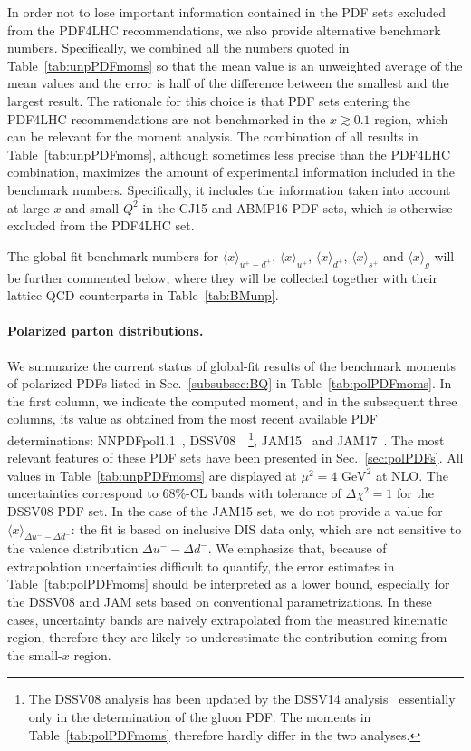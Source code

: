 In order not to lose important information contained in the PDF sets excluded 
from the PDF4LHC recommendations, we also provide alternative benchmark numbers.
%
Specifically, we combined all the numbers quoted in Table~\ref{tab:unpPDFmoms}
so that the mean value is an unweighted average of the mean 
values and the error is half of the difference between the smallest and the 
largest result.
%
The rationale for this choice is that PDF sets entering the PDF4LHC 
recommendations are not benchmarked in the $x\gtrsim 0.1$ region, which can be 
relevant for the moment analysis.
%
The combination of all results in Table~\ref{tab:unpPDFmoms}, although 
sometimes less precise than the PDF4LHC combination, maximizes the amount of 
experimental information included in the benchmark numbers.
%
Specifically, it includes the information taken into account 
at large $x$ and small $Q^2$ in the CJ15 and ABMP16 PDF sets, 
which is otherwise excluded from the PDF4LHC set.

The global-fit benchmark numbers for $\langle x\rangle_{u^+-d^+}$,
$\langle x \rangle_{u^+}$, $\langle x \rangle_{d^+}$, 
$\langle x \rangle_{s^+}$ and $\langle x \rangle_g$ will be further
commented below, where they will be collected together with their 
lattice-QCD counterparts in Table~\ref{tab:BMunp}.

\paragraph{Polarized parton distributions.}
%
We summarize the current status of global-fit results of the benchmark
moments of polarized PDFs listed in Sec.~\ref{subsubsec:BQ} in 
Table~\ref{tab:polPDFmoms}.
%
In the first column, we indicate the computed moment, and in the subsequent 
three columns, its value as obtained from the most recent available PDF 
determinations: NNPDFpol1.1~\cite{Nocera:2014gqa}, 
DSSV08~\cite{deFlorian:2009vb}~\footnote{The DSSV08 analysis has been updated
by the DSSV14 analysis~\cite{deFlorian:2014yva} essentially 
only in the determination of the gluon PDF. 
The moments in Table~\ref{tab:polPDFmoms} therefore hardly differ
in the two analyses.}, JAM15~\cite{Sato:2016tuz} and 
JAM17~\cite{Ethier:2017zbq}.
%
The most relevant features of these PDF sets have been presented in
Sec.~\ref{sec:polPDFs}.
%
All values in Table~\ref{tab:unpPDFmoms} are displayed
at $\mu^2=4\mbox{ GeV}^2$ at NLO.
%
The uncertainties correspond to 68\%-CL bands with tolerance of 
$\Delta \chi^2=1$ for the DSSV08 PDF set.
%
In the case of the JAM15 set, we do not provide a value for 
$\langle x \rangle _{\Delta u^--\Delta d^-}$:
the fit is based on inclusive DIS data only, which are not sensitive to 
the valence distribution $\Delta u^- - \Delta d^-$.
%
We emphasize that, because of extrapolation uncertainties difficult to quantify,
the error estimates in Table~\ref{tab:polPDFmoms} should be interpreted
as a lower bound, especially for the DSSV08 and JAM sets based on 
conventional parametrizations.
%
In these cases, uncertainty bands are naively extrapolated from the measured 
kinematic region, therefore they are likely to underestimate the contribution 
coming from the small-$x$ region.

